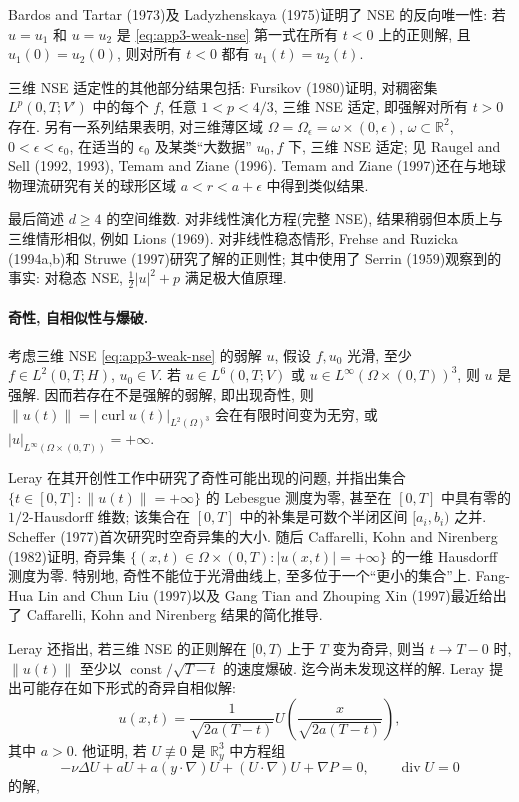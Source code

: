 \hypertarget{appendix-03-page-362}{}
Bardos and Tartar (1973)及 Ladyzhenskaya (1975)证明了 NSE 的反向唯一性: 若 $u=u_1$ 和 $u=u_2$ 是 
\eqref{eq:app3-weak-nse} 第一式在所有 $t<0$ 上的正则解, 且 $u_1(0)=u_2(0)$, 则对所有 $t<0$ 都有 $u_1(t)=u_2(t)$.

三维 NSE 适定性的其他部分结果包括: Fursikov (1980)证明, 对稠密集 $L^p(0,T;V')$ 中的每个 $f$, 任意 $1<p<4/3$, 三维 NSE 适定, 即强解对所有 $t>0$ 存在. 另有一系列结果表明, 对三维薄区域 $\Omega=\Omega_\epsilon=\omega\times(0,\epsilon)$, $\omega\subset\mathbb R^2$, $0<\epsilon<\epsilon_0$, 在适当的 $\epsilon_0$ 及某类``大数据'' $u_0,f$ 下, 三维 NSE 适定; 见 Raugel and Sell (1992, 1993), Temam and Ziane (1996). Temam and Ziane (1997)还在与地球物理流研究有关的球形区域 $a<r<a+\epsilon$ 中得到类似结果.

最后简述 $d\geq4$ 的空间维数. 对非线性演化方程(完整 NSE), 结果稍弱但本质上与三维情形相似, 例如 Lions (1969). 对非线性稳态情形, Frehse and Ruzicka (1994a,b)和 Struwe (1997)研究了解的正则性; 其中使用了 Serrin (1959)观察到的事实: 对稳态 NSE, $\frac12|u|^2+p$ 满足极大值原理.

\paragraph{奇性, 自相似性与爆破.}
考虑三维 NSE 
\eqref{eq:app3-weak-nse} 的弱解 $u$, 假设 $f,u_0$ 光滑, 至少 $f\in L^2(0,T;H)$, $u_0\in V$. 若 $u\in L^6(0,T;V)$ 或 $u\in L^\infty(\Omega\times(0,T))^3$, 则 $u$ 是强解. 因而若存在不是强解的弱解, 即出现奇性, 则 $\lVert u(t)\rVert=|\operatorname{curl}u(t)|_{L^2(\Omega)^3}$ 会在有限时间变为无穷, 或 $|u|_{L^\infty(\Omega\times(0,T))}=+\infty$.

Leray 在其开创性工作中研究了奇性可能出现的问题, 并指出集合 $\{t\in[0,T]:\lVert u(t)\rVert=+\infty\}$ 的 Lebesgue 测度为零, 甚至在 $[0,T]$ 中具有零的 $1/2$-Hausdorff 维数; 该集合在 $[0,T]$ 中的补集是可数个半闭区间 $[a_i,b_i)$ 之并. Scheffer (1977)首次研究时空奇异集的大小. 随后 Caffarelli, Kohn and Nirenberg (1982)证明, 奇异集 $\{(x,t)\in\Omega\times(0,T):|u(x,t)|=+\infty\}$ 的一维 Hausdorff 测度为零. 特别地, 奇性不能位于光滑曲线上, 至多位于一个``更小的集合''上. Fang-Hua Lin and Chun Liu (1997)以及 Gang Tian and Zhouping Xin (1997)最近给出了 Caffarelli, Kohn and Nirenberg 结果的简化推导.

Leray 还指出, 若三维 NSE 的正则解在 $[0,T)$ 上于 $T$ 变为奇异, 则当 $t\to T-0$ 时, $\lVert u(t)\rVert$ 至少以 $\operatorname{const}/\sqrt{T-t}$ 的速度爆破. 迄今尚未发现这样的解. Leray 提出可能存在如下形式的奇异自相似解:
\begin{equation}
u(x,t)=\frac1{\sqrt{2a(T-t)}}
U\left(\frac{x}{\sqrt{2a(T-t)}}\right),
\label{eq:app3-singular-self-similar}
\end{equation}
其中 $a>0$. 他证明, 若 $U\not\equiv0$ 是 $\mathbb R_y^3$ 中方程组
\begin{equation}
-\nu\Delta U+aU+a(y\cdot\nabla)U+(U\cdot\nabla)U+\nabla P=0,
\qquad\operatorname{div}U=0
\label{eq:app3-self-similar-profile}
\end{equation}
的解,

